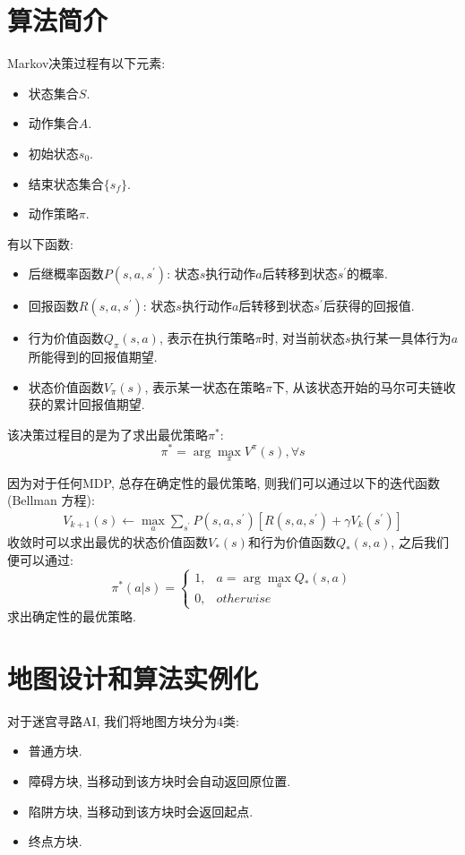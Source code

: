 \documentclass{acm_proc_article-sp}
\begin{document}

\section{算法简介}

Markov决策过程有以下元素:
\begin{itemize}
    \item 状态集合$S$.
    \item 动作集合$A$.
    \item 初始状态$s_0$.
    \item 结束状态集合$\{s_f\}$.
    \item 动作策略$\pi$.
\end{itemize}

有以下函数:
\begin{itemize}
    \item 后继概率函数$P(s, a, s^\prime)$: 状态$s$执行动作$a$后转移到状态$s^\prime$的概率.
    \item 回报函数$R(s, a, s^\prime)$: 状态$s$执行动作$a$后转移到状态$s^\prime$后获得的回报值.
    \item 行为价值函数$Q_\pi(s, a)$, 表示在执行策略$\pi$时, 对当前状态$s$执行某一具体行为$a$所能得到的回报值期望.
    \item 状态价值函数$V_\pi(s)$, 表示某一状态在策略$\pi$下, 从该状态开始的马尔可夫链收获的累计回报值期望.
\end{itemize}

该决策过程目的是为了求出最优策略$\pi^*$:
$$
\pi^* = \arg \max_\pi V^\pi(s), \forall s
$$

因为对于任何MDP, 总存在确定性的最优策略, 则我们可以通过以下的迭代函数(Bellman 方程):
\begin{align}
V_{k+1}(s) \gets \max_a \sum_{s^\prime}P(s, a, s^\prime)[R(s, a, s^\prime) + \gamma V_k(s^\prime)]
\end{align}
收敛时可以求出最优的状态价值函数$V_*(s)$和行为价值函数$Q_*(s, a)$, 之后我们便可以通过:
$$
\pi^*(a|s) = 
\begin{cases}
    1, & a = \arg \max_a Q_*(s, a) \\
    0, & otherwise
\end{cases}
$$
求出确定性的最优策略.

\section{地图设计和算法实例化}

对于迷宫寻路AI, 我们将地图方块分为4类:
\begin{itemize}
    \item 普通方块.
    \item 障碍方块, 当移动到该方块时会自动返回原位置.
    \item 陷阱方块, 当移动到该方块时会返回起点.
    \item 终点方块.
\end{itemize}
\end{document}
